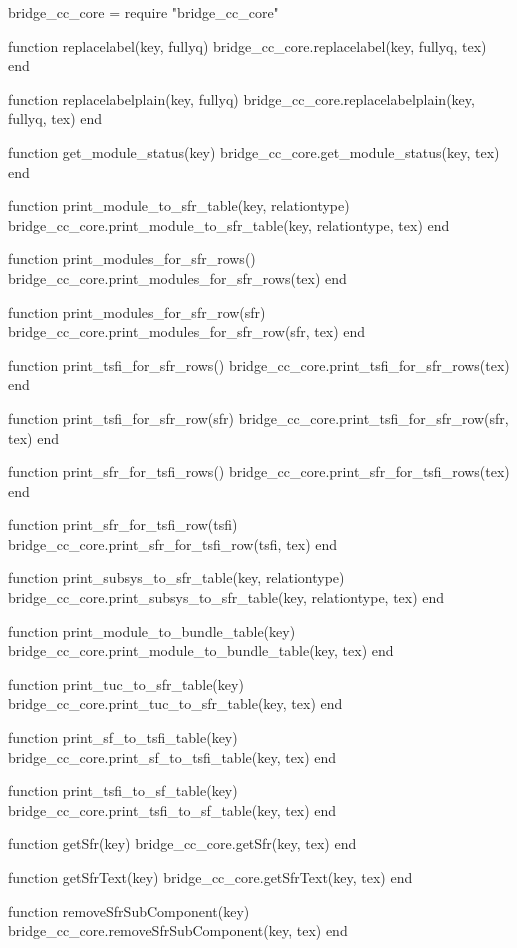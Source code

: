\begin{luacode}

  bridge_cc_core = require "bridge_cc_core"

  function replacelabel(key, fullyq)
    bridge_cc_core.replacelabel(key, fullyq, tex)
  end

  function replacelabelplain(key, fullyq)
    bridge_cc_core.replacelabelplain(key, fullyq, tex)
  end

  function get_module_status(key)
    bridge_cc_core.get_module_status(key, tex)
  end

  function print_module_to_sfr_table(key, relationtype)
    bridge_cc_core.print_module_to_sfr_table(key, relationtype, tex)
  end

  function print_modules_for_sfr_rows()
    bridge_cc_core.print_modules_for_sfr_rows(tex)
  end

  function print_modules_for_sfr_row(sfr)
    bridge_cc_core.print_modules_for_sfr_row(sfr, tex)
  end

  function print_tsfi_for_sfr_rows()
    bridge_cc_core.print_tsfi_for_sfr_rows(tex)
  end

  function print_tsfi_for_sfr_row(sfr)
    bridge_cc_core.print_tsfi_for_sfr_row(sfr, tex)
  end

  function print_sfr_for_tsfi_rows()
    bridge_cc_core.print_sfr_for_tsfi_rows(tex)
  end

  function print_sfr_for_tsfi_row(tsfi)
    bridge_cc_core.print_sfr_for_tsfi_row(tsfi, tex)
  end

  function print_subsys_to_sfr_table(key, relationtype)
    bridge_cc_core.print_subsys_to_sfr_table(key, relationtype, tex)
  end

  function print_module_to_bundle_table(key)
    bridge_cc_core.print_module_to_bundle_table(key, tex)
  end

  function print_tuc_to_sfr_table(key)
    bridge_cc_core.print_tuc_to_sfr_table(key, tex)
  end

  function print_sf_to_tsfi_table(key)
    bridge_cc_core.print_sf_to_tsfi_table(key, tex)
  end

  function print_tsfi_to_sf_table(key)
    bridge_cc_core.print_tsfi_to_sf_table(key, tex)
  end

  function getSfr(key)
    bridge_cc_core.getSfr(key, tex)
  end

  function getSfrText(key)
    bridge_cc_core.getSfrText(key, tex)
  end

  function removeSfrSubComponent(key)
    bridge_cc_core.removeSfrSubComponent(key, tex)
  end


\end{luacode}
